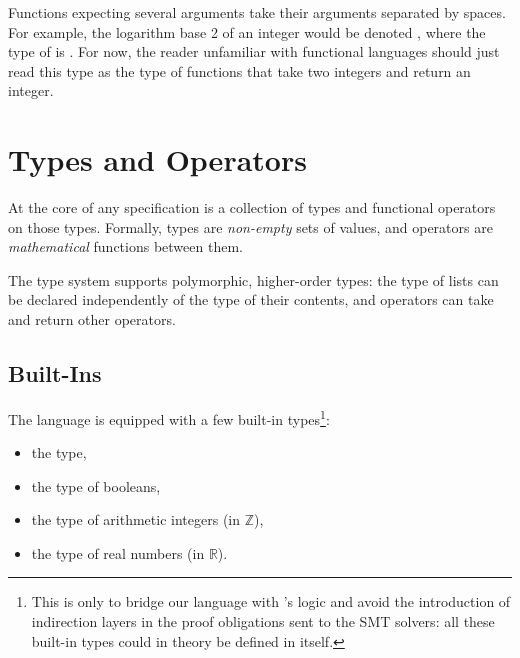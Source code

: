 Functions expecting several arguments take their arguments separated by spaces.
For example, the logarithm base 2 of an integer  would be denoted
, where the type of  is
. For now, the reader unfamiliar with functional
languages should just read this type as the type of functions that take two
integers and return an integer.



\section{Types and Operators\label{sec:types}}

At the core of any \EC specification is a collection of types and functional
operators on those types. Formally, \EC types are \emph{non-empty} sets of
values, and operators are \emph{mathematical} functions between them.


The \EC type system supports polymorphic, higher-order types: the type of lists
can be declared independently of the type of their contents, and operators can
take and return other operators.

\subsection{Built-Ins}
The language is equipped with a few built-in types\footnote{This is only to
bridge our language with \WhyThree's logic and avoid the introduction of
indirection layers in the proof obligations sent to the SMT solvers: all these
built-in types could in theory be defined in \EC itself.}:
\begin{itemize}
\item the  type,
\item the  type of booleans,
\item the  type of arithmetic integers (in $\mathbb{Z}$),
\item the  type of real numbers (in $\mathbb{R}$).
\end{itemize}

